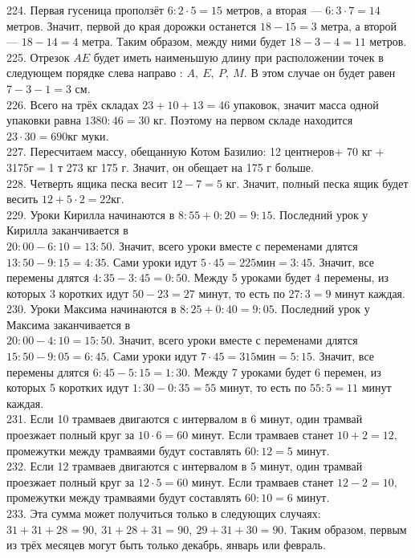\documentclass[12pt]{article}
\begin{document}
224. Первая гусеница проползёт $6:2\cdot5=15$ метров, а вторая --- $6:3\cdot7=14$ метров. Значит, первой до края дорожки останется $18-15=3$ метра, а второй --- $18-14=4$ метра. Таким образом, между ними будет $18-3-4=11$ метров.\\
225. Отрезок $AE$ будет иметь наименьшую длину при расположении точек в следующем порядке слева направо : $A,\ E,\ P,\ M.$ В этом случае он будет равен $7-3-1=3$ см.\\
226. Всего на трёх складах $23+10+13=46$ упаковок, значит масса одной упаковки равна $1380:46=30$ кг. Поэтому на первом складе находится $23\cdot30=690$кг муки.\\
227. Пересчитаем массу, обещанную Котом Базилио: 12 центнеров$+$ 70 кг $+$ 3175г$=$1 т 273 кг 175 г. Значит, он обещает на 175 г больше.\\
228. Четверть ящика песка весит $12-7=5$ кг. Значит, полный песка ящик будет весить $12+5\cdot2=22$кг.\\
229. Уроки Кирилла начинаются в $8:55+0:20=9:15.$ Последний урок у Кирилла заканчивается в \\ $20:00-6:10=13:50.$ Значит, всего уроки вместе с переменами длятся $13:50-9:15=4:35.$ Сами уроки идут $5\cdot45=225\text{мин}=3:45.$ Значит, все перемены длятся $4:35-3:45=0:50.$ Между 5 уроками будет 4 перемены, из которых 3 коротких идут $50-23=27$ минут, то есть по $27:3=9$ минут каждая.\\
230. Уроки Максима начинаются в $8:25+0:40=9:05.$ Последний урок у Максима заканчивается в \\ $20:00-4:10=15:50.$ Значит, всего уроки вместе с переменами длятся $15:50-9:05=6:45.$ Сами уроки идут $7\cdot45=315\text{мин}=5:15.$ Значит, все перемены длятся $6:45-5:15=1:30.$ Между 7 уроками будет 6 перемен, из которых 5 коротких идут $1:30-0:35=55$ минут, то есть по $55:5=11$ минут каждая.\\
231. Если 10 трамваев двигаются с интервалом в 6 минут, один трамвай проезжает полный круг за $10\cdot6=60$ минут. Если трамваев станет $10+2=12,$ промежутки между трамваями будут составлять $60:12=5$ минут.\\
232. Если 12 трамваев двигаются с интервалом в 5 минут, один трамвай проезжает полный круг за $12\cdot5=60$ минут. Если трамваев станет $12-2=10,$ промежутки между трамваями будут составлять $60:10=6$ минут.\\
233. Эта сумма может получиться только в следующих случаях: $31+31+28=90,\ 31+28+31=90,\ 29+31+30=90.$ Таким образом, первым из трёх месяцев могут быть только декабрь, январь или февраль.\\
\end{document}
